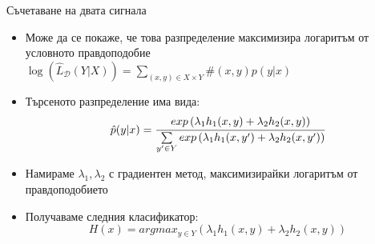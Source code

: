 \documentclass[9pt]{beamer}
\newcommand{\B}[1]{\left(#1\right)}
\begin{document}
    \begin{frame}[t]{Съчетаване на двата сигнала}
        \begin{itemize}
            \setlength\itemsep{\fill}
            \pause
            \item Може да се покаже, че това разпределение максимизира логаритъм от условното правдоподобие
            \pause $\log\B{\widehat{L}_{\mathcal{D}}(Y|X)} = \sum\limits_{(x, y) \in X\times Y} \#(x, y) p(y|x)$
            \pause
            \item Търсеното разпределение има вида:
            \pause
            \[\hat{p}(y|x) = \cfrac{exp\B{\lambda_1 h_1(x, y) + \lambda_2 h_2(x, y)}}{\sum\limits_{y' \in Y} exp\B{\lambda_1 h_1(x, y') + \lambda_2 h_2(x, y')} }\]
            \pause
            \item Намираме $\lambda_1, \lambda_2$ с градиентен метод, максимизирайки логаритъм от правдоподобието
            \pause
            \item Получаваме следния класификатор:
            \pause \[H(x) = argmax_{y\in Y} \B{\lambda_1 h_1(x, y) + \lambda_2 h_2(x, y)}\]
        \end{itemize}
    \end{frame}
\end{document}
